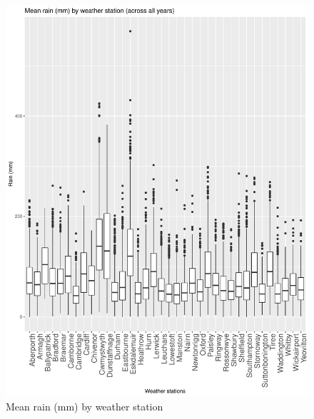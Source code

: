 \documentclass[12pt, oneside, openany]{book}
\begin{document}
\begin{figure}
	\centering
	\captionsetup{justification=centering}
	\includegraphics[scale=0.7]{question_1_010_eda_charts_box_whisker_rain}
	\caption{Mean rain (mm) by weather station}
	\label{fig:question_1_010_eda_charts_box_whisker_rain}
\end{figure}
\end{document}
